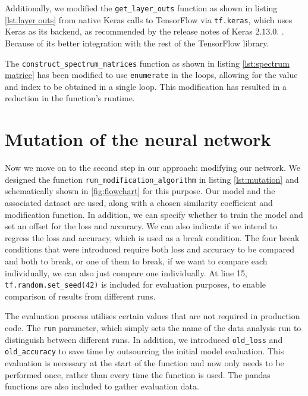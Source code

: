 Additionally, we modified the \texttt{get\_layer\_outs} function as shown in listing \ref{lst:layer outs} from native Keras \cite{chollet_keras_2015} calls to TensorFlow \cite{martin_abadi_tensorflow_2015} via \texttt{tf.keras}, which uses Keras as its backend, as recommended by the release notes of Keras 2.13.0. .
Because of its better integration with the rest of the TensorFlow library.



The \texttt{construct\_spectrum\_matrices} function as shown in listing \ref{lst:spectrum matrice} has been modified to use \texttt{enumerate} in the loops, allowing for the value and index to be obtained in a single loop.
This modification has resulted in a reduction in the function's runtime.



\section{Mutation of the neural network}\label{sec:mutation-of-the-neural-network}
Now we move on to the second step in our approach: modifying our network.
We designed the function \texttt{run\_modification\_algorithm} in listing \ref{lst:mutation} and schematically shown in \ref{fig:flowchart} for this purpose.
Our model and the associated dataset are used, along with a chosen similarity coefficient and modification function.
In addition, we can specify whether to train the model and set an offset for the loss and accuracy.
We can also indicate if we intend to regress the loss and accuracy, which is used as a break condition.
The four break conditions that were introduced require both loss and accuracy to be compared and both to break, or one of them to break, if we want to compare each individually, we can also just compare one individually.
At line 15, \texttt{tf.random.set\_seed(42)} is included for evaluation purposes, to enable comparison of results from different runs.

The evaluation process utilises certain values that are not required in production code.
The \texttt{run} parameter, which simply sets the name of the data analysis run to distinguish between different runs.
In addition, we introduced \texttt{old\_loss} and \texttt{old\_accuracy} to save time by outsourcing the initial model evaluation.
This evaluation is necessary at the start of the function and now only needs to be performed once, rather than every time the function is used.
The pandas functions are also included to gather evaluation data.

